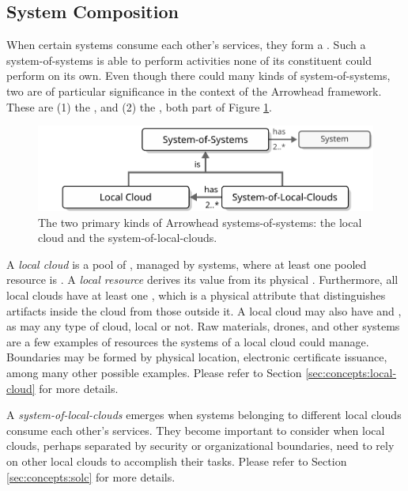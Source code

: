 \subsection{System Composition}

When certain systems consume each other's services, they form a .
Such a system-of-systems is able to perform activities none of its constituent  could perform on its own.
Even though there could many kinds of system-of-systems, two are of particular significance in the context of the Arrowhead framework.
These are (1) the , and (2) the , both part of Figure \ref{fig:system-of-systems}.

\begin{figure}[ht!]
  \centering
  \includegraphics[scale=0.9]{figures/system-of-systems}
  \caption{
    The two primary kinds of Arrowhead systems-of-systems: the local cloud and the system-of-local-clouds.
  }
  \label{fig:system-of-systems}
\end{figure}

A \textit{local cloud} is a pool of , managed by systems, where at least one pooled resource is .
A \textit{local resource} derives its value from its physical .
Furthermore, all local clouds have at least one , which is a physical attribute that distinguishes artifacts inside the cloud from those outside it.
A local cloud may also have  and , as may any type of cloud, local or not.
Raw materials, drones, and other systems are a few examples of resources the systems of a local cloud could manage.
Boundaries may be formed by physical location, electronic certificate issuance, among many other possible examples.
Please refer to Section \ref{sec:concepts:local-cloud} for more details.

A \textit{system-of-local-clouds} emerges when systems belonging to different local clouds consume each other's services.
They become important to consider when local clouds, perhaps separated by security or organizational boundaries, need to rely on other local clouds to accomplish their tasks.
Please refer to Section \ref{sec:concepts:solc} for more details.
